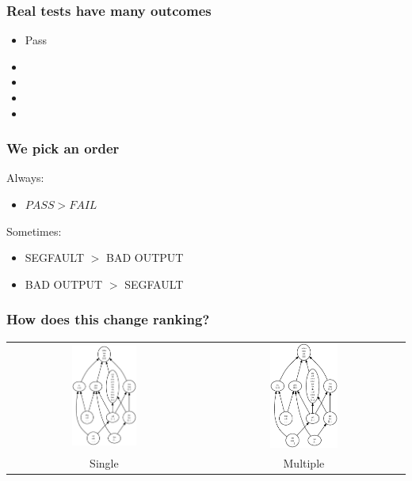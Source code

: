 \documentclass[svgnames,14pt]{beamer}
\newcommand\fail{\mathit{FAIL}}
\newcommand\pass{\mathit{PASS}}
\theoremstyle{definition}
\begin{document}
\begin{frame}
\frametitle{Real tests have many outcomes}
\begin{itemize}
\item Pass
\item {}
\item {}
\item {}
\item {}
\end{itemize}
\end{frame}

\begin{frame}
\frametitle{We pick an order}
Always:
\begin{itemize}
\item $\pass>\fail$
\end{itemize}
Sometimes:
\begin{itemize}
\item SEGFAULT $>$ BAD OUTPUT
\item BAD OUTPUT $>$ SEGFAULT
\end{itemize}
\end{frame}

\begin{frame}
\frametitle{How does this change ranking?}

\begin{center} 
\begin{tabular}{cc}
\includegraphics[width=0.35\textwidth]{rank1.ps}
&
\includegraphics[width=0.35\textwidth]{rank2.ps}\\
Single &
Multiple \\
\end{tabular}
\end{center}

\end{frame}
\end{document}

